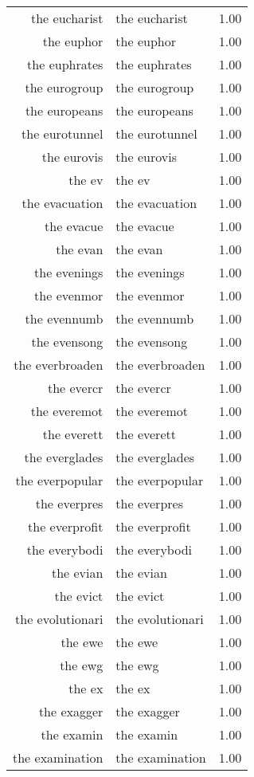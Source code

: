 \begin{table}[ht]
\begin{tabular}{rlr}
  the eucharist & the eucharist & 1.00 \\ 
  the euphor & the euphor & 1.00 \\ 
  the euphrates & the euphrates & 1.00 \\ 
  the eurogroup & the eurogroup & 1.00 \\ 
  the europeans & the europeans & 1.00 \\ 
  the eurotunnel & the eurotunnel & 1.00 \\ 
  the eurovis & the eurovis & 1.00 \\ 
  the ev & the ev & 1.00 \\ 
  the evacuation & the evacuation & 1.00 \\ 
  the evacue & the evacue & 1.00 \\ 
  the evan & the evan & 1.00 \\ 
  the evenings & the evenings & 1.00 \\ 
  the evenmor & the evenmor & 1.00 \\ 
  the evennumb & the evennumb & 1.00 \\ 
  the evensong & the evensong & 1.00 \\ 
  the everbroaden & the everbroaden & 1.00 \\ 
  the evercr & the evercr & 1.00 \\ 
  the everemot & the everemot & 1.00 \\ 
  the everett & the everett & 1.00 \\ 
  the everglades & the everglades & 1.00 \\ 
  the everpopular & the everpopular & 1.00 \\ 
  the everpres & the everpres & 1.00 \\ 
  the everprofit & the everprofit & 1.00 \\ 
  the everybodi & the everybodi & 1.00 \\ 
  the evian & the evian & 1.00 \\ 
  the evict & the evict & 1.00 \\ 
  the evolutionari & the evolutionari & 1.00 \\ 
  the ewe & the ewe & 1.00 \\ 
  the ewg & the ewg & 1.00 \\ 
  the ex & the ex & 1.00 \\ 
  the exagger & the exagger & 1.00 \\ 
  the examin & the examin & 1.00 \\ 
  the examination & the examination & 1.00 \\ 

\end{tabular}
\end{table}
